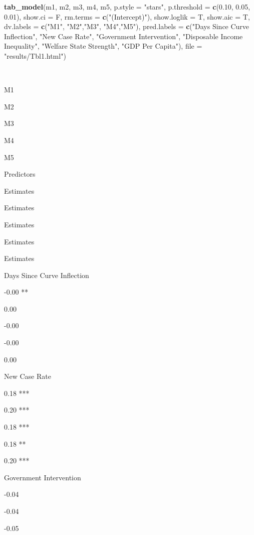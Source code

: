 \documentclass[
]{article}
\newenvironment{Shaded}{\begin{snugshade}}{\end{snugshade}}
\newcommand{\DataTypeTok}[1]{\textcolor[rgb]{0.13,0.29,0.53}{#1}}
\newcommand{\FloatTok}[1]{\textcolor[rgb]{0.00,0.00,0.81}{#1}}
\newcommand{\KeywordTok}[1]{\textcolor[rgb]{0.13,0.29,0.53}{\textbf{#1}}}
\newcommand{\NormalTok}[1]{#1}
\newcommand{\StringTok}[1]{\textcolor[rgb]{0.31,0.60,0.02}{#1}}
\begin{document}
\begin{Shaded}
\begin{Highlighting}[]
\KeywordTok{tab_model}\NormalTok{(m1, m2, m3, m4, m5, }\DataTypeTok{p.style =} \StringTok{"stars"}\NormalTok{, }\DataTypeTok{p.threshold =} \KeywordTok{c}\NormalTok{(}\FloatTok{0.10}\NormalTok{, }\FloatTok{0.05}\NormalTok{, }\FloatTok{0.01}\NormalTok{), }\DataTypeTok{show.ci =}\NormalTok{ F, }\DataTypeTok{rm.terms =} \KeywordTok{c}\NormalTok{(}\StringTok{"(Intercept)"}\NormalTok{), }\DataTypeTok{show.loglik =}\NormalTok{ T, }\DataTypeTok{show.aic =}\NormalTok{ T, }\DataTypeTok{dv.labels =} \KeywordTok{c}\NormalTok{(}\StringTok{"M1"}\NormalTok{, }\StringTok{"M2"}\NormalTok{,}\StringTok{"M3"}\NormalTok{, }\StringTok{"M4"}\NormalTok{,}\StringTok{"M5"}\NormalTok{), }\DataTypeTok{pred.labels =} \KeywordTok{c}\NormalTok{(}\StringTok{"Days Since Curve Inflection"}\NormalTok{, }\StringTok{"New Case Rate"}\NormalTok{, }\StringTok{"Government Intervention"}\NormalTok{, }\StringTok{"Disposable Income Inequality"}\NormalTok{, }\StringTok{"Welfare State Strength"}\NormalTok{, }\StringTok{"GDP Per Capita"}\NormalTok{), }\DataTypeTok{file =} \StringTok{"results/Tbl1.html"}\NormalTok{)}
\end{Highlighting}
\end{Shaded}

~

M1

M2

M3

M4

M5

Predictors

Estimates

Estimates

Estimates

Estimates

Estimates

Days Since Curve Inflection

-0.00 **

0.00

-0.00

-0.00

0.00

New Case Rate

0.18 ***

0.20 ***

0.18 ***

0.18 **

0.20 ***

Government Intervention

-0.04

-0.04

-0.05
\end{document}
